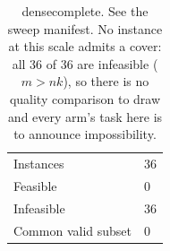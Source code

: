 \begin{table}[tb]
\centering
\caption{densecomplete. See the sweep manifest. No instance at this scale admits a cover: all 36 of 36 are infeasible ($m > nk$), so there is no quality comparison to draw and every arm's task here is to announce impossibility.}
\label{tab:cmp-densecomplete}
\begin{tabular}{ll}
\toprule
Instances & 36 \\
Feasible & 0 \\
Infeasible & 36 \\
Common valid subset & 0 \\
\bottomrule
\end{tabular}
\end{table}
